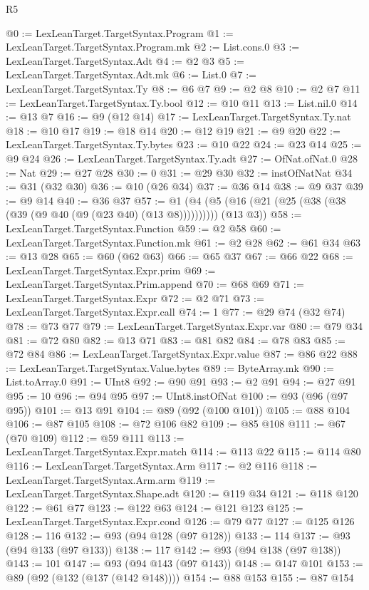 \begin{lexlean}{R5}
\begin{coremodule}
@0 := LexLeanTarget.TargetSyntax.Program
@1 := LexLeanTarget.TargetSyntax.Program.mk
@2 := List.cons.{0}
@3 := LexLeanTarget.TargetSyntax.Adt
@4 := @2 @3
@5 := LexLeanTarget.TargetSyntax.Adt.mk
@6 := List.{0}
@7 := LexLeanTarget.TargetSyntax.Ty
@8 := @6 @7
@9 := @2 @8
@10 := @2 @7
@11 := LexLeanTarget.TargetSyntax.Ty.bool
@12 := @10 @11
@13 := List.nil.{0}
@14 := @13 @7
@16 := @9 (@12 @14)
@17 := LexLeanTarget.TargetSyntax.Ty.nat
@18 := @10 @17
@19 := @18 @14
@20 := @12 @19
@21 := @9 @20
@22 := LexLeanTarget.TargetSyntax.Ty.bytes
@23 := @10 @22
@24 := @23 @14
@25 := @9 @24
@26 := LexLeanTarget.TargetSyntax.Ty.adt
@27 := OfNat.ofNat.{0}
@28 := Nat
@29 := @27 @28
@30 := 0
@31 := @29 @30
@32 := instOfNatNat
@34 := @31 (@32 @30)
@36 := @10 (@26 @34)
@37 := @36 @14
@38 := @9 @37
@39 := @9 @14
@40 := @36 @37
@57 := @1 (@4 (@5 (@16 (@21 (@25 (@38 (@38 (@39 (@9 @40 (@9 (@23 @40) (@13 @8)))))))))) (@13 @3))
@58 := LexLeanTarget.TargetSyntax.Function
@59 := @2 @58
@60 := LexLeanTarget.TargetSyntax.Function.mk
@61 := @2 @28
@62 := @61 @34
@63 := @13 @28
@65 := @60 (@62 @63)
@66 := @65 @37
@67 := @66 @22
@68 := LexLeanTarget.TargetSyntax.Expr.prim
@69 := LexLeanTarget.TargetSyntax.Prim.append
@70 := @68 @69
@71 := LexLeanTarget.TargetSyntax.Expr
@72 := @2 @71
@73 := LexLeanTarget.TargetSyntax.Expr.call
@74 := 1
@77 := @29 @74 (@32 @74)
@78 := @73 @77
@79 := LexLeanTarget.TargetSyntax.Expr.var
@80 := @79 @34
@81 := @72 @80
@82 := @13 @71
@83 := @81 @82
@84 := @78 @83
@85 := @72 @84
@86 := LexLeanTarget.TargetSyntax.Expr.value
@87 := @86 @22
@88 := LexLeanTarget.TargetSyntax.Value.bytes
@89 := ByteArray.mk
@90 := List.toArray.{0}
@91 := UInt8
@92 := @90 @91
@93 := @2 @91
@94 := @27 @91
@95 := 10
@96 := @94 @95
@97 := UInt8.instOfNat
@100 := @93 (@96 (@97 @95))
@101 := @13 @91
@104 := @89 (@92 (@100 @101))
@105 := @88 @104
@106 := @87 @105
@108 := @72 @106 @82
@109 := @85 @108
@111 := @67 (@70 @109)
@112 := @59 @111
@113 := LexLeanTarget.TargetSyntax.Expr.match
@114 := @113 @22
@115 := @114 @80
@116 := LexLeanTarget.TargetSyntax.Arm
@117 := @2 @116
@118 := LexLeanTarget.TargetSyntax.Arm.arm
@119 := LexLeanTarget.TargetSyntax.Shape.adt
@120 := @119 @34
@121 := @118 @120
@122 := @61 @77
@123 := @122 @63
@124 := @121 @123
@125 := LexLeanTarget.TargetSyntax.Expr.cond
@126 := @79 @77
@127 := @125 @126
@128 := 116
@132 := @93 (@94 @128 (@97 @128))
@133 := 114
@137 := @93 (@94 @133 (@97 @133))
@138 := 117
@142 := @93 (@94 @138 (@97 @138))
@143 := 101
@147 := @93 (@94 @143 (@97 @143))
@148 := @147 @101
@153 := @89 (@92 (@132 (@137 (@142 @148))))
@154 := @88 @153
@155 := @87 @154

\end{coremodule}
\end{lexlean}
